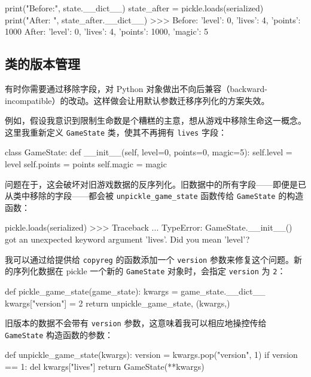 \begin{codebox}[python]
print("Before:", state.__dict__)
state_after = pickle.loads(serialized)
print("After: ", state_after.__dict__)
>>>
Before: {'level': 0, 'lives': 4, 'points': 1000}
After:  {'level': 0, 'lives': 4, 'points': 1000, 'magic': 5}
\end{codebox}

\subsection{类的版本管理}

有时你需要通过移除字段，对 Python 对象做出不向后兼容（backward-incompatible）的改动。这样做会让用默认参数迁移序列化的方案失效。

例如，假设我意识到限制生命数是个糟糕的主意，想从游戏中移除生命这一概念。这里我重新定义 \texttt{GameState} 类，使其不再拥有 \texttt{lives} 字段：

\begin{codebox}[python]
class GameState:
    def __init__(self, level=0, points=0, magic=5):
        self.level = level
        self.points = points
        self.magic = magic
\end{codebox}

问题在于，这会破坏对旧游戏数据的反序列化。旧数据中的所有字段——即便是已从类中移除的字段——都会被 \texttt{unpickle\_game\_state} 函数传给 \texttt{GameState} 的构造函数：

\begin{codebox}[python]
pickle.loads(serialized)
>>>
Traceback ...
TypeError: GameState.__init__() got an unexpected keyword
argument 'lives'. Did you mean 'level'?
\end{codebox}

我可以通过给提供给 \texttt{copyreg} 的函数添加一个 \texttt{version} 参数来修复这个问题。新的序列化数据在 pickle 一个新的 \texttt{GameState} 对象时，会指定 \texttt{version} 为 \texttt{2}：

\begin{codebox}[python]
def pickle_game_state(game_state):
    kwargs = game_state.__dict__
    kwargs["version"] = 2
    return unpickle_game_state, (kwargs,)
\end{codebox}

旧版本的数据不会带有 \texttt{version} 参数，这意味着我可以相应地操控传给 \texttt{GameState} 构造函数的参数：

\begin{codebox}[python]
def unpickle_game_state(kwargs):
    version = kwargs.pop("version", 1)
    if version == 1:
        del kwargs["lives"]
    return GameState(**kwargs)
\end{codebox}

